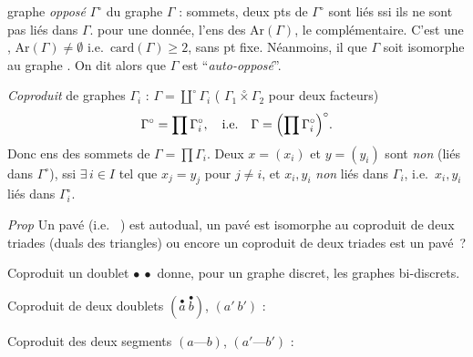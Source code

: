 \documentclass[11pt,a4paper]{article}
\begin{document}
graphe \struck{\ill{}} \emph{opposé} $\Gamma^{\circ}$ du graphe $\Gamma$ :  sommets, deux pts  de $\Gamma^{\circ}$ sont liés ssi ils ne sont pas liés dans $\Gamma$.  pour une  \ill{} donnée, l'ens des  \ill{}  $\mathrm{Ar}(\Gamma)$, le  \ill{} complémentaire. C'est une  \ill{},  $\mathrm{Ar}(\Gamma)\neq\emptyset$ i.e.\ $\mathrm{card}(\Gamma)\geq 2$, sans pt fixe. Néanmoins, il   que $\Gamma$ soit isomorphe au graphe \struck{\ill{}}. On dit alors que $\Gamma$ est ``\emph{auto-opposé}''.

\emph{Coproduit} de graphes $\Gamma_i$ :   $\Gamma=\overset{\circ}{\coprod}\Gamma_i$ ( $\Gamma_1\overset{\circ}{\times}\Gamma_2$ pour deux facteurs)
\[
  \Gamma^{\circ}=\prod\Gamma_i^{\circ},\quad\text{i.e.}\quad \Gamma=\Bigl(\prod\Gamma_i^{\circ}\Bigr)^{\circ}.
\]
Donc ens des sommets de $\Gamma=\prod\Gamma_i$. Deux   $x=(x_i)$ et $y=(y_i)$ sont \emph{non}  (liés dans $\Gamma^{\circ}$), ssi $\exists\, i\in I$ tel que $x_j=y_j$ pour $j\neq i$, et $x_i,y_i$ \emph{non} liés dans $\Gamma_i$, i.e.\ $x_i,y_i$ liés dans $\Gamma_i^{\circ}$.

\emph{Prop} Un pavé (i.e.\   ) est autodual,  un pavé est isomorphe au coproduit de deux triades (duals des triangles) ou encore un \ill{} coproduit de deux triades est un pavé~?

Coproduit  \struck{\ill{}} un doublet $\bullet\ \bullet$ donne, pour un graphe discret, les graphes bi-discrets.

Coproduit de deux doublets $(\overset{\bullet}{a}\ \overset{\bullet}{b})$, $(a'\ b')$ :

Coproduit des deux segments $(a\text{---}b)$, $(a'\text{---}b')$ :

\end{document}
